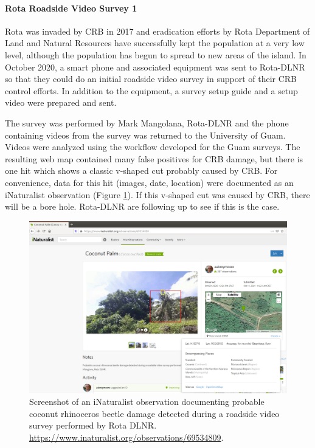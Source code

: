 \documentclass[12pt,letterpaper,english,bibliography=totocnumbered, abstract=on]{scrartcl}
\begin{document}
\clearpage
\paragraph{Rota Roadside Video Survey 1}

Rota was invaded by CRB in 2017 and eradication efforts by Rota Department of Land and Natural Resources have successfully kept the population at a very low level, although the population has begun to spread to new areas of the island. In October 2020, a smart phone and associated equipment was sent to Rota-DLNR so that they could do an initial roadside video survey in support of their CRB control efforts. In addition to the equipment, a survey setup guide \cite{mooreSetAutomatedRoadside2020} and a setup video \cite{mooreYouTubeVideoMounting2020} were prepared and sent.
 
The survey was performed by Mark Mangolana, Rota-DLNR and the phone containing videos from the survey was returned to the University of Guam.  Videos were analyzed using the workflow developed for the Guam surveys. The resulting web map contained many false positives for CRB damage, but there is one hit which shows a classic v-shaped cut probably caused by CRB. For convenience, data for this hit (images, date, location) were documented as an iNaturalist observation (Figure \ref{fig:rota-inat-obs}). If this v-shaped cut was caused by CRB, there will be a bore hole. Rota-DLNR are following up to see if this is the case.


\begin{figure}[h]
	\centering
	\includegraphics[width=1\linewidth]{../images/Rota-iNat-obs}
	\caption{Screenshot of an iNaturalist observation documenting probable coconut rhinoceros beetle damage detected during a roadside video survey performed by Rota DLNR. \url{https://www.inaturalist.org/observations/69534809}.}
	\label{fig:rota-inat-obs}
\end{figure}
\end{document}
